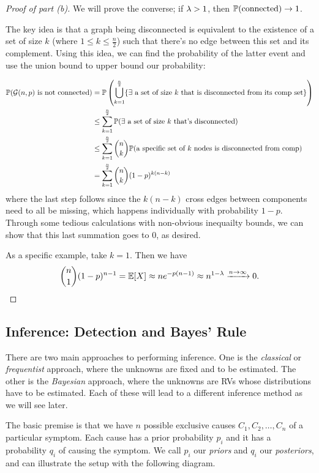 \documentclass[11 pt]{scrartcl}
\begin{document}
\begin{proof}[Proof of part (b)]
    We will prove the converse; if $\lambda > 1$, then $\mathbb P(\text{connected}) \to 1$. 

    The key idea is that a graph being disconnected is equivalent to the existence of a set of size $k$ (where $1\leq k \leq \frac{n}{2}$) such that there's no edge between this set and its complement. Using this idea, we can find the probability of the latter event and use the union bound to upper bound our probability: 

    \begin{align*}
        \mathbb P(\mathcal G(n,p)\text{ is not connected}) 
        &= \mathbb P\left(\bigcup_{k=1}^{\frac{n}{2}} \{\exists\text{ a set of size }k\text{ that is disconnected from its comp set}\}\right) \\ 
        &\leq \sum_{k=1}^{\frac{n}{2}} \mathbb P(\exists\text{ a set of size }k\text{ that's disconnected}) \\ 
        &\leq \sum_{k=1}^{\frac{n}{2}} \dbinom{n}{k} \mathbb P(\text{a specific set of }k\text{ nodes is disconnected from comp}) \\ 
        &= \sum_{k=1}^{\frac{n}{2}} \dbinom{n}{k} (1-p)^{k(n-k)}
    \end{align*}
    where the last step follows since the $k(n-k)$ cross edges between components need to all be missing, which happens individually with probability $1-p$. Through some tedious calculations with non-obvious inequailty bounds, we can show that this last summation goes to 0, as desired. 

    As a specific example, take $k = 1$. Then we have 
    \[ \dbinom{n}{1} (1-p)^{n-1} = \mathbb E[X] \approx ne^{-p(n-1)} \approx n^{1-\lambda} \xrightarrow{n\to\infty} 0.\] 
\end{proof}

\subsection{Inference: Detection and Bayes' Rule}

There are two main approaches to performing inference. One is the \emph{classical} or \emph{frequentist} approach, where the unknowns are fixed and to be estimated. The other is the \emph{Bayesian} approach, where the unknowns are RVs whose distributions have to be estimated. Each of these will lead to a different inference method as we will see later. 

The basic premise is that we have $n$ possible exclusive causes $C_1, C_2, \dots, C_n$ of a particular symptom. Each cause has a prior probability $p_i$ and it has a probability $q_i$ of causing the symptom. We call $p_i$ our \emph{priors} and $q_i$ our \emph{posteriors}, and can illustrate the setup with the following diagram. 
\end{document}
